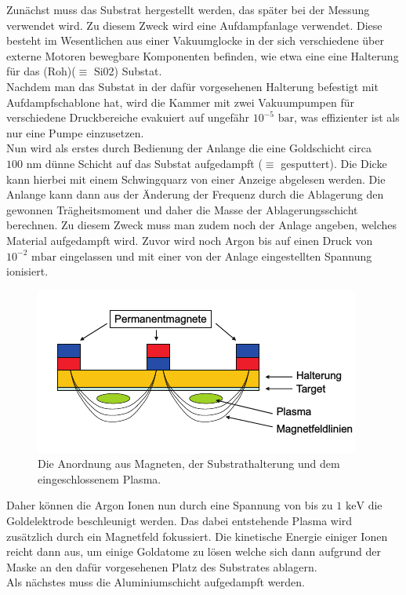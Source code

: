 \documentclass[twoside,        %
               BCOR12mm,       %
               english,ngerman, %
               fleqn,headsepline=false,footsepline=false
              ]{MFPREPORT}
\begin{document}
Zunächst muss das Substrat hergestellt werden, das später bei der Messung verwendet wird.
Zu diesem Zweck wird eine Aufdampfanlage verwendet. 
Diese besteht im Wesentlichen aus einer Vakuumglocke in der sich verschiedene über externe Motoren bewegbare Komponenten befinden, wie etwa eine eine Halterung für das (Roh)($\equiv$ Si02) Substat.
\\
Nachdem man das Substat in der dafür vorgesehenen Halterung befestigt mit Aufdampfschablone hat, wird die Kammer mit zwei Vakuumpumpen für verschiedene Druckbereiche evakuiert auf ungefähr $10^{-5} \text{ bar}$, was effizienter ist als nur eine Pumpe einzusetzen.
\\
Nun wird als erstes durch Bedienung der Anlange die eine Goldschicht circa $100 \text{ nm}$ dünne Schicht auf das Substat aufgedampft ($\equiv$ gesputtert).
Die Dicke kann hierbei mit einem Schwingquarz von einer Anzeige abgelesen werden.
Die Anlange kann dann aus der Änderung der Frequenz durch die Ablagerung den gewonnen Trägheitsmoment und daher die Masse der Ablagerungsschicht berechnen.
Zu diesem Zweck muss man zudem noch der Anlage angeben, welches Material aufgedampft wird.
Zuvor wird noch Argon bis auf einen Druck von $10^{-2} \text{ mbar}$ eingelassen und mit einer von der Anlage eingestellten Spannung ionisiert.
\begin{figure}
\centering
\includegraphics[scale=0.9]{magneton.png}
\caption{Die Anordnung aus Magneten, der Substrathalterung und dem eingeschlossenem Plasma.}
\label{fig:aufbaub}
\end{figure}
Daher können die Argon Ionen nun durch eine Spannung von bis zu $1 \text{ keV}$ die Goldelektrode beschleunigt werden. Das dabei entstehende Plasma wird zusätzlich durch ein Magnetfeld fokussiert.
Die kinetische Energie einiger Ionen reicht dann aus, um einige Goldatome zu lösen welche sich dann aufgrund der Maske an den dafür vorgesehenen Platz des Substrates ablagern.
\\
Als nächstes muss die Aluminiumschicht aufgedampft werden. 
\end{document}

